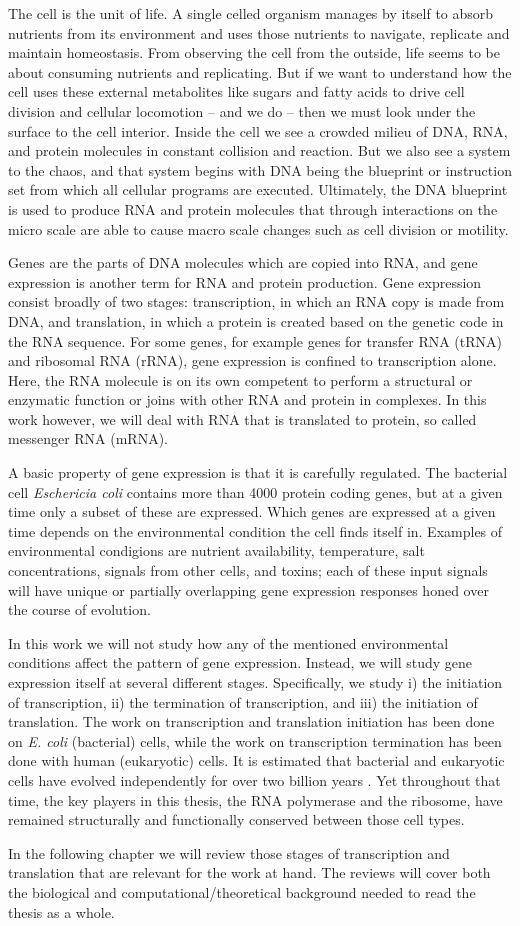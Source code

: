 %

The cell is the unit of life. A single celled organism manages by itself to
absorb nutrients from its environment and uses those nutrients to navigate,
replicate and maintain homeostasis. From observing the cell from the outside,
life seems to be about consuming nutrients and replicating. But if we want to
understand how the cell uses these external metabolites like sugars and fatty
acids to drive cell division and cellular locomotion -- and we do -- then we
must look under the surface to the cell interior. Inside the cell we see a
crowded milieu of DNA, RNA, and protein molecules in constant collision and
reaction. But we also see a system to the chaos, and that system begins with
DNA being the blueprint or instruction set from which all cellular programs are
executed. Ultimately, the DNA blueprint is used to produce RNA and protein
molecules that through interactions on the micro scale are able to cause macro
scale changes such as cell division or motility.

Genes are the parts of DNA molecules which are copied into RNA, and gene
expression is another term for RNA and protein production. Gene expression
consist broadly of two stages: transcription, in which an RNA copy is made from
DNA, and translation, in which a protein is created based on the genetic code
in the RNA sequence. For some genes, for example genes for transfer RNA (tRNA)
and ribosomal RNA (rRNA), gene expression is confined to transcription alone.
Here, the RNA molecule is on its own competent to perform a structural or
enzymatic function or joins with other RNA and protein in complexes. In this
work however, we will deal with RNA that is translated to protein, so called
messenger RNA (mRNA).

A basic property of gene expression is that it is carefully regulated. The
bacterial cell \textit{Eschericia coli} contains more than 4000 protein coding
genes, but at a given time only a subset of these are expressed. Which genes
are expressed at a given time depends on the environmental condition the cell
finds itself in. Examples of environmental condigions are nutrient
availability, temperature, salt concentrations, signals from other cells, and
toxins; each of these input signals will have unique or partially overlapping
gene expression responses honed over the course of evolution.

In this work we will not study how any of the mentioned environmental
conditions affect the pattern of gene expression. Instead, we will study gene
expression itself at several different stages. Specifically, we study i) the
initiation of transcription, ii) the termination of transcription, and iii) the
initiation of translation. The work on transcription and translation initiation
has been done on \textit{E. coli} (bacterial) cells, while the work on
transcription termination has been done with human (eukaryotic) cells. It is
estimated that bacterial and eukaryotic cells have evolved independently for
over two billion years \cite{vellai_origin_1999}. Yet throughout that time, the
key players in this thesis, the RNA polymerase and the ribosome, have remained
structurally and functionally conserved between those cell types.

In the following chapter we will review those stages of transcription and
translation that are relevant for the work at hand. The reviews will cover both
the biological and computational/theoretical background needed to read the
thesis as a whole.

